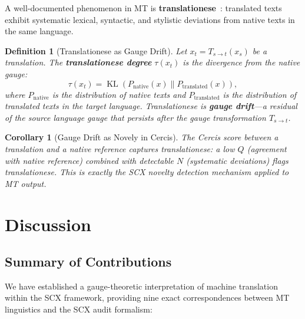 \documentclass[12pt,a4paper]{article}
\newtheorem{corollary}[theorem]{Corollary}
\newtheorem{definition}[theorem]{Definition}
\theoremstyle{remark}
\newcommand{\SCX}{\textsf{SCX}}
\newcommand{\Cercis}{\textsf{Cercis}}
\DeclareMathOperator{\KL}{KL}
\begin{document}
A well-documented phenomenon in MT is \textbf{translationese}~\cite{gellerstam1986translationese,
volansky2015translationese}: translated texts exhibit systematic
lexical, syntactic, and stylistic deviations from native texts in the
same language.

\begin{definition}[Translationese as Gauge Drift]
\label{def:translationese}
Let $x_t = T_{s\to t}(x_s)$ be a translation. The \textbf{translationese
degree} $\tau(x_t)$ is the divergence from the native gauge:
\begin{equation}
  \tau(x_t) = \KL(P_{\text{native}}(x) \| P_{\text{translated}}(x)),
\end{equation}
where $P_{\text{native}}$ is the distribution of native texts and
$P_{\text{translated}}$ is the distribution of translated texts in
the target language. Translationese is \textbf{gauge drift}---a
residual of the source language gauge that persists after the
gauge transformation $T_{s\to t}$.
\end{definition}

\begin{corollary}[Gauge Drift as Novely in Cercis]
\label{cor:translationese_cercis}
The \Cercis{} score between a translation and a native reference
captures translationese: a low $Q$ (agreement with native reference)
combined with detectable $N$ (systematic deviations) flags
translationese. This is exactly the \SCX{} novelty detection
mechanism applied to MT output.
\end{corollary}


\section{Discussion}
\label{sec:discussion}

\subsection{Summary of Contributions}

We have established a gauge-theoretic interpretation of machine
translation within the \SCX{} framework, providing nine exact
correspondences between MT linguistics and the \SCX{} audit formalism:
\end{document}
